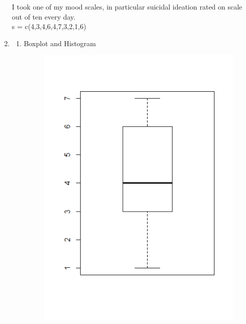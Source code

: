 \documentclass{article}
\begin{document}
\begin{enumerate}
	I took one of my mood scales, in particular suicidal ideation rated on scale out of ten every day. \\
	s = c(4,3,4,6,4,7,3,2,1,6)
\item
	\begin{enumerate}
	\item Boxplot and Histogram
	\begin{figure}[H]
		\includegraphics[scale=.45]{boxplotsuicide.png}
	\end{figure}
	\begin{figure}

\end{figure}
\end{enumerate}
\end{enumerate}
\end{document}
